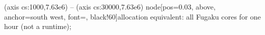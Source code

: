  (axis cs:1000,7.63e6) -- (axis cs:30000,7.63e6) node[pos=0.03, above, anchor=south west, font=\scriptsize, black!60]{allocation equivalent: all Fugaku cores for one hour (not a runtime)};
